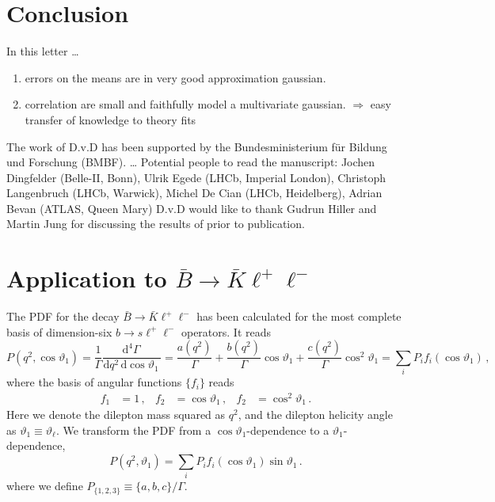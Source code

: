 \documentclass[aps,prd,reprint,nofootinbib,preprintnumbers]{revtex4}
\newcommand{\rmdx}[1]{\mbox{d} #1 \,} %
\renewcommand{\theta}{\vartheta}
\newcommand{\danny}[1]{{\color{purple}#1}}
\newcommand{\fred}[1]{{\color{brown!85!black}#1}}
\begin{document}
\section{Conclusion}

In this letter \dots
\begin{enumerate}
    \item errors on the means are in very good approximation gaussian.
    \item correlation are small and faithfully model a multivariate gaussian. \fred{$\Rightarrow$ easy transfer of knowledge to theory fits}
\end{enumerate}


\acknowledgments

The work of D.v.D has been supported by the Bundesministerium f\"ur Bildung und Forschung (BMBF).
\dots
\danny{Potential people to read the manuscript: Jochen Dingfelder (Belle-II, Bonn), Ulrik Egede (LHCb, Imperial London), Christoph Langenbruch (LHCb, Warwick), Michel De Cian (LHCb, Heidelberg), Adrian Bevan (ATLAS, Queen Mary)  }
D.v.D would like to thank Gudrun Hiller and Martin Jung for discussing the results of \cite{Das:2014sra} prior to publication.

\appendix

\section{Application to $\bar{B}\to\bar{K}\ell^+\ell^-$}
\label{app:btokll}

The PDF for the decay $\bar{B}\to\bar{K}\ell^+\ell^-$ has been calculated for the most
complete basis of dimension-six $b\to s \ell^+\ell^-$ operators. It reads \cite{Bobeth:2007dw,Bobeth:2012vn}
\begin{equation}
    P(q^2, \cos\theta_1) = \frac{1}{\Gamma} \frac{\rmdx{^4\Gamma}}{\rmdx{q^2} \rmdx{\cos\theta_1}} = \frac{a(q^2)}{\Gamma} + \frac{b(q^2)}{\Gamma} \cos\theta_1 + \frac{c(q^2)}{\Gamma} \cos^2\theta_1 = \sum_i P_i f_i(\cos\theta_1)\,,
\end{equation}
where the basis of angular functions $\lbrace f_i\rbrace$ reads
\begin{equation}
\begin{aligned}
    f_1 & = 1\,, &
    f_2 & = \cos\theta_1\,, &
    f_2 & = \cos^2\theta_1\,.
\end{aligned}
\end{equation}
Here we denote the dilepton mass squared as $q^2$, and the dilepton helicity angle as $\theta_1 \equiv \theta_{\ell}$. We transform the PDF from a $\cos\theta_1$-dependence
to a $\theta_1$-dependence,
\begin{equation}
    P(q^2, \theta_1) = \sum_i P_i f_i(\cos\theta_1) \sin \theta_1\,.
\end{equation}
where we define $P_{\lbrace 1,2,3\rbrace} \equiv \lbrace a, b, c\rbrace / \Gamma$.\\
\end{document}
